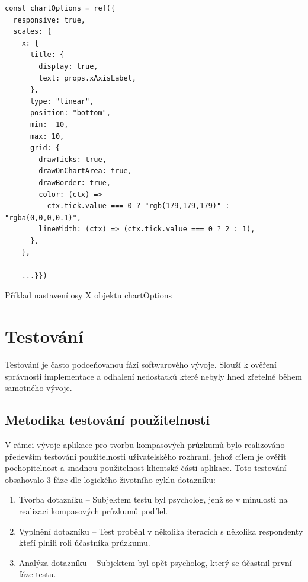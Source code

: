 \begin{listing}[h!]
    \begin{verbatim}
const chartOptions = ref({
  responsive: true,
  scales: {
    x: {
      title: {
        display: true,
        text: props.xAxisLabel,
      },
      type: "linear",
      position: "bottom",
      min: -10,
      max: 10,
      grid: {
        drawTicks: true,
        drawOnChartArea: true,
        drawBorder: true,
        color: (ctx) =>
          ctx.tick.value === 0 ? "rgb(179,179,179)" : "rgba(0,0,0,0.1)",
        lineWidth: (ctx) => (ctx.tick.value === 0 ? 2 : 1),
      },
    },

    ...}})
    \end{verbatim}
\caption{Příklad nastavení osy X objektu chartOptions}
\label{code:chartoptions}
\end{listing}


\chapter{Testování}
\label{subsection:testing}
Testování je často podceňovanou fází softwarového vývoje. Slouží k ověření 
správnosti implementace a odhalení nedostatků které nebyly hned zřetelné během
samotného vývoje.

\section{Metodika testování použitelnosti}
V rámci vývoje aplikace pro tvorbu kompasových průzkumů bylo realizováno
především testování použitelnosti uživatelského rozhraní, jehož
cílem je ověřit pochopitelnost a snadnou použitelnost klientské části aplikace. 
Toto testování obsahovalo 3 fáze dle logického životního cyklu dotazníku:

\begin{enumerate}
    \item Tvorba dotazníku – Subjektem testu byl psycholog, jenž se v minulosti
    na realizaci kompasových průzkumů podílel.
    \item Vyplnění dotazníku – Test proběhl v několika iteracích s několika respondenty
    kteří plnili roli účastníka průzkumu.
    \item Analýza dotazníku – Subjektem byl opět psycholog, který se účastnil
    první fáze testu.
\end{enumerate}

